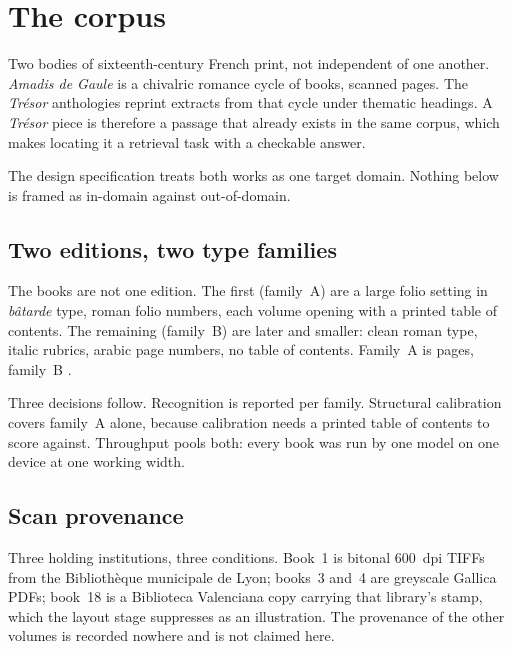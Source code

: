 %
\section{The corpus}
\label{sec:corpus}

Two bodies of sixteenth-century French print, not independent of one another.
\emph{Amadis de Gaule} is a chivalric romance cycle of \ocrBooks{} books,
\ocrPages{} scanned pages. The \emph{Trésor} anthologies reprint extracts from
that cycle under thematic headings. A \emph{Trésor} piece is therefore a
passage that already exists in the same corpus, which makes locating it a
retrieval task with a checkable answer.

The design specification treats both works as one target domain. Nothing below
is framed as in-domain against out-of-domain.

\subsection{Two editions, two type families}

The \ocrBooks{} books are not one edition. The first \ocrBooksFamilyA{}
(family~A) are a large folio setting in \emph{bâtarde} type, roman folio
numbers, each volume opening with a printed table of contents. The remaining
\ocrBooksFamilyB{} (family~B) are later and smaller: clean roman type, italic
rubrics, arabic page numbers, no table of contents. Family~A is
\ocrPagesFamilyA{} pages, family~B \ocrPagesFamilyB{}.

Three decisions follow. Recognition is reported per family. Structural
calibration covers family~A alone, because calibration needs a printed table of
contents to score against. Throughput pools both: every book was run by one
model on one device at one working width.

\subsection{Scan provenance}

Three holding institutions, three conditions. Book~1 is bitonal 600~dpi TIFFs
from the Bibliothèque municipale de Lyon; books~3 and~4 are greyscale Gallica
PDFs; book~18 is a Biblioteca Valenciana copy carrying that library's stamp,
which the layout stage suppresses as an illustration. The provenance of the
other volumes is recorded nowhere and is not claimed here.


